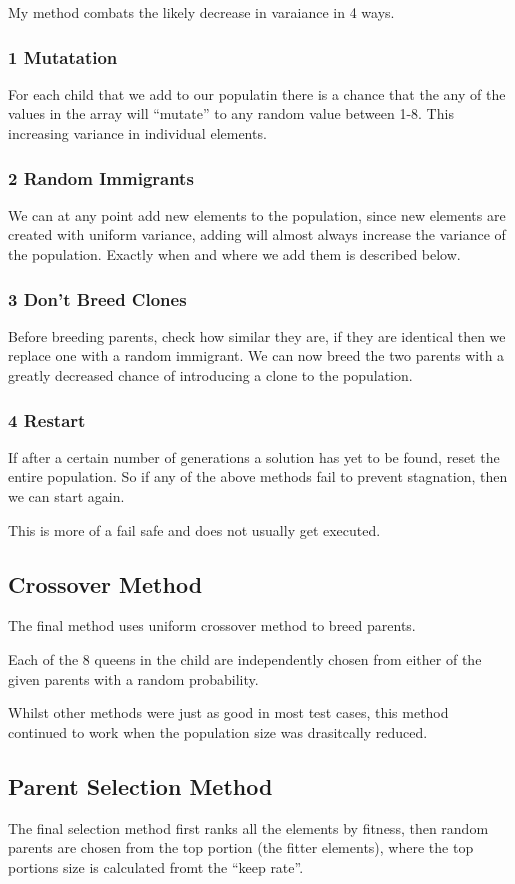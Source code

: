 \documentclass[a4paper,11pt]{article}
\begin{document}
My method combats the likely decrease in varaiance in 4 ways.
\subsubsection*{1 Mutatation}
For each child that we add to our populatin there is a chance that the any of the values in the array will ``mutate'' to any random value between 1-8. This increasing variance in individual elements.
\subsubsection*{2 Random Immigrants}
We can at any point add new elements to the population, since new elements are created with uniform variance, adding will almost always increase the variance of the population.
Exactly when and where we add them is described below.
\subsubsection*{3 Don't Breed Clones}
Before breeding parents, check how similar they are, if they are identical then we replace one with a random immigrant. We can now breed the two parents with a greatly decreased chance of introducing a clone to the population.
\subsubsection*{4 Restart}
If after a certain number of generations a solution has yet to be found, reset the entire population. So if any of the above methods fail to prevent stagnation, then we can start again.

This is more of a fail safe and does not usually get executed.

\subsection*{Crossover Method}
The final method uses uniform crossover method to breed parents.

Each of the 8 queens in the child are independently chosen from either of the given parents with a random probability.

Whilst other methods were just as good in most test cases, this method continued to work when the population size was drasitcally reduced.
\subsection*{Parent Selection Method}
The final selection method first ranks all the elements by fitness, then random parents are chosen from the top portion (the fitter elements), where the top portions size is calculated fromt the ``keep rate''.
\end{document}
